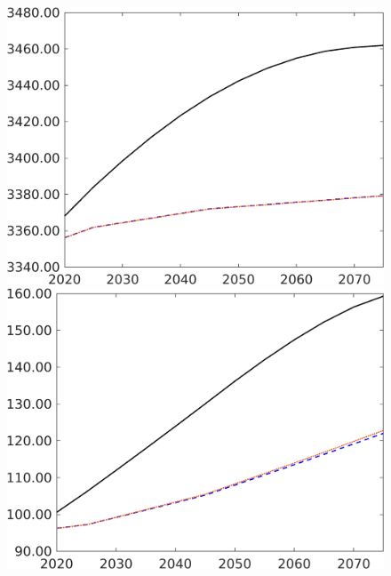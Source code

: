 \begin{figure}[h!!]
\begin{minipage}[]{0.32\textwidth}
	\end{minipage}
	\begin{minipage}[]{0.32\textwidth}
		\includegraphics[width=1\textwidth]{../../codding_model/own_basedOnFried/optimalPol_elastS_DisuSci/figures/all_1705/Af_CompEffOPT_T_NoTaus_spillover0_noskill1_sep1_BN0_ineq0_red0_etaa0.79_lgd0.png}
	\end{minipage}
	\begin{minipage}[]{0.32\textwidth}
		\includegraphics[width=1\textwidth]{../../codding_model/own_basedOnFried/optimalPol_elastS_DisuSci/figures/all_1705/Ag_CompEffOPT_T_NoTaus_spillover0_noskill1_sep1_BN0_ineq0_red0_etaa0.79_lgd0.png}

\end{minipage}
\end{figure}

